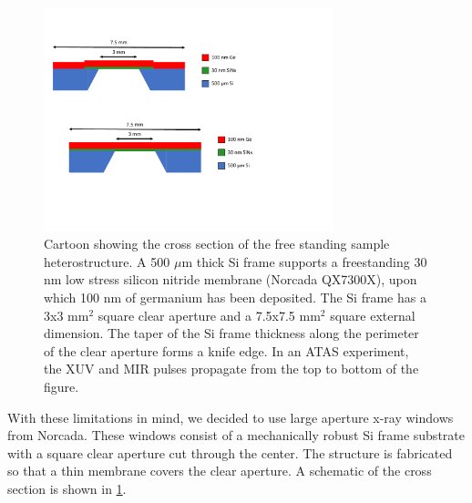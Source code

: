 \begin{figure}
	\centering
	\includegraphics[width=0.75\textwidth]{figures/chap4/Sample_Geometry.pdf}
	\caption{Cartoon showing the cross section of the free standing sample heterostructure. A 500 $\mu$m thick Si frame supports a freestanding 30 nm low stress silicon nitride membrane (Norcada QX7300X), upon which 100 nm of germanium has been deposited. The Si frame has a 3x3 mm$^2$ square clear aperture and a 7.5x7.5 mm$^2$ square external dimension. The taper of the Si frame thickness along the perimeter of the clear aperture forms a knife edge. In an ATAS experiment, the XUV and MIR pulses propagate from the top to bottom of the figure.}
	\label{fig:Sample_Geometry}
\end{figure}

With these limitations in mind, we decided to use large aperture x-ray windows from Norcada. These windows consist of a mechanically robust Si frame substrate with a square clear aperture cut through the center. The structure is fabricated so that a thin membrane covers the clear aperture. A schematic of the cross section is shown in \cref{fig:Sample_Geometry}.

